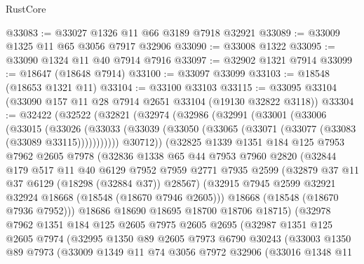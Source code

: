 \begin{lexlean}{RustCore}
\begin{coremodule}
@33083 := @33027 @1326 @11 @66 @3189 @7918 @32921
@33089 := @33009 @1325 @11 @65 @3056 @7917 @32906
@33090 := @33008 @1322
@33095 := @33090 @1324 @11 @40 @7914 @7916
@33097 := @32902 @1321 @7914
@33099 := @18647 (@18648 @7914)
@33100 := @33097 @33099
@33103 := @18548 (@18653 @1321 @11)
@33104 := @33100 @33103
@33115 := @33095 @33104 (@33090 @157 @11 @28 @7914 @2651 @33104 (@19130 @32822 @3118))
@33304 := @32422
    (@32522
      (@32821
        (@32974
          (@32986
            (@32991
              (@33001
                (@33006
                  (@33015
                    (@33026
                      (@33033
                        (@33039 (@33050 (@33065 (@33071 (@33077 (@33083 (@33089 @33115)))))))))))
                @30712))
            (@32825
              @1339
              @1351
              @184
              @125
              @7953
              @7962
              @2605
              @7978
              (@32836
                @1338
                @65
                @44
                @7953
                @7960
                @2820
                (@32844
                  @179
                  @517
                  @11
                  @40
                  @6129
                  @7952
                  @7959
                  @2771
                  @7935
                  @2599
                  (@32879 @37 @11 @37 @6129 (@18298 (@32884 @37)) @28567)
                  (@32915 @7945 @2599 @32921 @32924 @18668 (@18548 (@18670 @7946 @2605)))
                  @18668
                  (@18548 (@18670 @7936 @7952)))
                @18686
                @18690
                @18695
                @18700
                @18706
                @18715)
              (@32978
                @7962
                @1351
                @184
                @125
                @2605
                @7975
                @2605
                @2695
                (@32987
                  @1351
                  @125
                  @2605
                  @7974
                  (@32995
                    @1350
                    @89
                    @2605
                    @7973
                    @6790
                    @30243
                    (@33003
                      @1350
                      @89
                      @7973
                      (@33009
                        @1349
                        @11
                        @74
                        @3056
                        @7972
                        @32906
                        (@33016
                          @1348
                          @11

\end{coremodule}
\end{lexlean}

